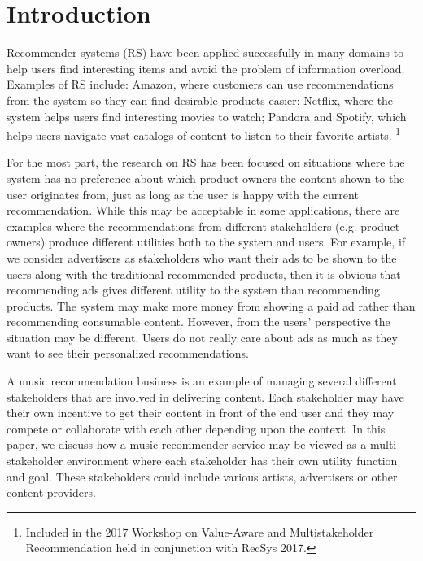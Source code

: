 \section{Introduction}
Recommender systems (RS) have been applied successfully in many domains to help users find interesting items and avoid the problem of information overload. Examples of RS include: Amazon, where customers can use recommendations from the system so they can find desirable products easier; Netflix, where the system helps users find interesting movies to watch; Pandora and Spotify, which helps users navigate vast catalogs of content to listen to their favorite artists.
{\let\thefootnote\relax\footnote{Included in the 2017 Workshop on Value-Aware and Multistakeholder Recommendation held in conjunction with RecSys 2017.}}
 
For the most part, the research on RS has been focused on situations where the system has no preference about which product owners the content shown to the user originates from, just as long as the user is happy with the current recommendation.  While this may be acceptable in some applications, there are examples where the recommendations from different stakeholders (e.g. product owners) produce different utilities both to the system and users. For example, if we consider advertisers as stakeholders who want their ads to be shown to the users along with the traditional recommended products, then it is obvious that recommending ads gives different utility to the system than recommending products. The system may make more money from showing a paid ad rather than recommending consumable content. However, from the users' perspective the situation may be different. Users do not really care about ads as much as they want to see their personalized recommendations.

A music recommendation business is an example of managing several different stakeholders that are involved in delivering content. Each stakeholder may have their own incentive to get their content in front of the end user and they may compete or collaborate with each other depending upon the context. In this paper, we discuss how a music recommender service may be viewed as a multi-stakeholder environment where each stakeholder has their own utility function and goal. These stakeholders could include various artists, advertisers or other content providers.

